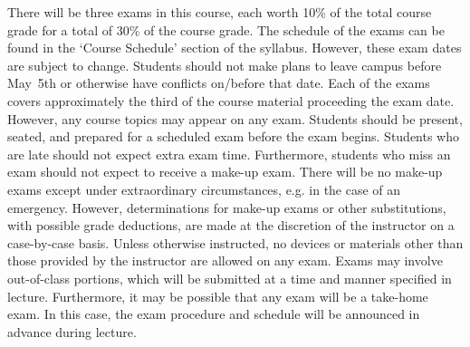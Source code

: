\documentclass[11pt,letterpaper]{article}
\begin{document}
There will be three exams in this course, each worth 10\% of the total course grade for a total of 30\% of the course grade. The schedule of the exams can be found in the `Course Schedule' section of the syllabus. However, these exam dates are subject to change. Students should not make plans to leave campus before May~5th or otherwise have conflicts on/before that date. Each of the exams covers approximately the third of the course material proceeding the exam date. However, any course topics may appear on any exam. Students should be present, seated, and prepared for a scheduled exam before the exam begins. Students who are late should not expect extra exam time. Furthermore, students who miss an exam should not expect to receive a make-up exam. There will be no make-up exams except under extraordinary circumstances, e.g. in the case of an emergency. However, determinations for make-up exams or other substitutions, with possible grade deductions, are made at the discretion of the instructor on a case-by-case basis. Unless otherwise instructed, no devices or materials other than those provided by the instructor are allowed on any exam. Exams may involve out-of-class portions, which will be submitted at a time and manner specified in lecture. Furthermore, it may be possible that any exam will be a take-home exam. In this case, the exam procedure and schedule will be announced in advance during lecture. 
\sectionbreak
\end{document}
